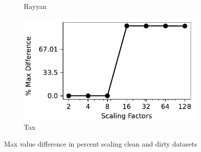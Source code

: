 \begin{figure}[!ht]
\begin{subfigure}{0.32\textwidth}
    \caption{Rayyan}
    \label{exp:max_rayyan}
\end{subfigure}
\hfill
\begin{subfigure}{0.32\textwidth}
    \includegraphics[width=\textwidth]{figures/plot/max/max_diff_tax.pdf}
    \caption{Tax}
    \label{exp:max_tax}
\end{subfigure}
\hfill
\caption{Max value difference in percent scaling clean and dirty datasets}
\label{exp:max_difference_datasets}
\end{figure}



